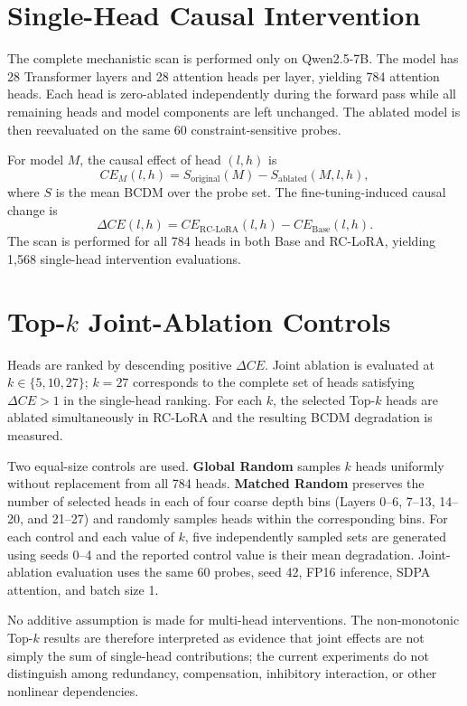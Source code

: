 \documentclass[11pt]{article}
\begin{document}
\section{Single-Head Causal Intervention}

The complete mechanistic scan is performed only on Qwen2.5-7B. The model has 28 Transformer layers and 28 attention heads per layer, yielding 784 attention heads. Each head is zero-ablated independently during the forward pass while all remaining heads and model components are left unchanged. The ablated model is then reevaluated on the same 60 constraint-sensitive probes.

For model $M$, the causal effect of head $(l,h)$ is
\begin{equation}
CE_M(l,h)=S_{\mathrm{original}}(M)-S_{\mathrm{ablated}}(M,l,h),
\end{equation}
where $S$ is the mean BCDM over the probe set. The fine-tuning-induced causal change is
\begin{equation}
\Delta CE(l,h)=CE_{\mathrm{RC\text{-}LoRA}}(l,h)-CE_{\mathrm{Base}}(l,h).
\end{equation}
The scan is performed for all 784 heads in both Base and RC-LoRA, yielding 1,568 single-head intervention evaluations.

\section{Top-$k$ Joint-Ablation Controls}

Heads are ranked by descending positive $\Delta CE$. Joint ablation is evaluated at $k\in\{5,10,27\}$; $k=27$ corresponds to the complete set of heads satisfying $\Delta CE>1$ in the single-head ranking. For each $k$, the selected Top-$k$ heads are ablated simultaneously in RC-LoRA and the resulting BCDM degradation is measured.

Two equal-size controls are used. \textbf{Global Random} samples $k$ heads uniformly without replacement from all 784 heads. \textbf{Matched Random} preserves the number of selected heads in each of four coarse depth bins (Layers 0--6, 7--13, 14--20, and 21--27) and randomly samples heads within the corresponding bins. For each control and each value of $k$, five independently sampled sets are generated using seeds 0--4 and the reported control value is their mean degradation. Joint-ablation evaluation uses the same 60 probes, seed 42, FP16 inference, SDPA attention, and batch size 1.

No additive assumption is made for multi-head interventions. The non-monotonic Top-$k$ results are therefore interpreted as evidence that joint effects are not simply the sum of single-head contributions; the current experiments do not distinguish among redundancy, compensation, inhibitory interaction, or other nonlinear dependencies.
\end{document}
